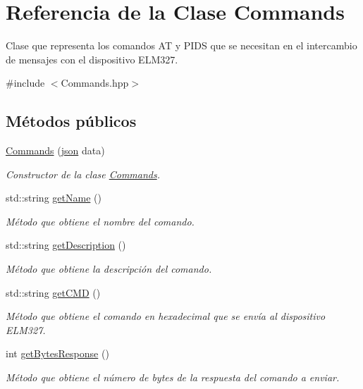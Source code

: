 \hypertarget{classCommands}{}\section{Referencia de la Clase Commands}
\label{classCommands}


Clase que representa los comandos AT y P\+I\+DS que se necesitan en el intercambio de mensajes con el dispositivo E\+L\+M327.  




{\ttfamily \#include $<$Commands.\+hpp$>$}

\subsection*{Métodos públicos}
\begin{DoxyCompactItemize}
\item 
\hyperlink{classCommands_ad71a0aafa9f942580b6c316ca07aef48}{Commands} (\hyperlink{Commands_8hpp_ab701e3ac61a85b337ec5c1abaad6742d}{json} data)
\begin{DoxyCompactList}\small\item\em Constructor de la clase \hyperlink{classCommands}{Commands}. \end{DoxyCompactList}\item 
std\+::string \hyperlink{classCommands_adf3d8a96310b1f4e57a6ecf0f2f153ea}{get\+Name} ()
\begin{DoxyCompactList}\small\item\em Método que obtiene el nombre del comando. \end{DoxyCompactList}\item 
std\+::string \hyperlink{classCommands_ad82fe7dfcf1908423bdb59d048020e26}{get\+Description} ()
\begin{DoxyCompactList}\small\item\em Método que obtiene la descripción del comando. \end{DoxyCompactList}\item 
std\+::string \hyperlink{classCommands_a9aee21ab91fdfc8e9daa59e1e8f20b73}{get\+C\+MD} ()
\begin{DoxyCompactList}\small\item\em Método que obtiene el comando en hexadecimal que se envía al dispositivo E\+L\+M327. \end{DoxyCompactList}\item 
int \hyperlink{classCommands_a9b3d961dbebbd25f141d18cd5a267738}{get\+Bytes\+Response} ()
\begin{DoxyCompactList}\small\item\em Método que obtiene el número de bytes de la respuesta del comando a enviar. \end{DoxyCompactList}\item 

\end{DoxyCompactItemize}
